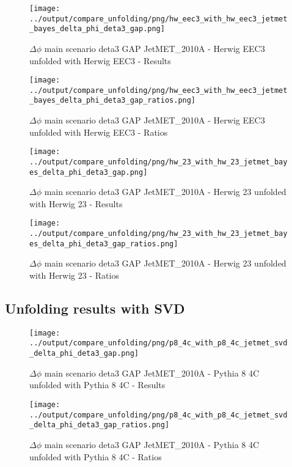 \documentclass[11pt]{book}
\begin{document}
\begin{figure}[ht]
\centering
\texttt{[image: ../output/compare\_unfolding/png/hw\_eec3\_with\_hw\_eec3\_jetmet\_bayes\_delta\_phi\_deta3\_gap.png]}
\caption{$\Delta\phi$ main scenario deta3 GAP JetMET\_2010A - Herwig EEC3 unfolded with Herwig EEC3 - Results}
\label{hw_eec3_hw_eec3_jetmet_bayes_delta_phi_deta3_gap_a}
\end{figure}

\begin{figure}[ht]
\centering
\texttt{[image: ../output/compare\_unfolding/png/hw\_eec3\_with\_hw\_eec3\_jetmet\_bayes\_delta\_phi\_deta3\_gap\_ratios.png]}
\caption{$\Delta\phi$ main scenario deta3 GAP JetMET\_2010A - Herwig EEC3 unfolded with Herwig EEC3 - Ratios}
\label{hw_eec3_hw_eec3_jetmet_bayes_delta_phi_deta3_gap_b}
\end{figure}

\begin{figure}[ht]
\centering
\texttt{[image: ../output/compare\_unfolding/png/hw\_23\_with\_hw\_23\_jetmet\_bayes\_delta\_phi\_deta3\_gap.png]}
\caption{$\Delta\phi$ main scenario deta3 GAP JetMET\_2010A - Herwig 23 unfolded with Herwig 23 - Results}
\label{hw_23_hw_23_jetmet_bayes_delta_phi_deta3_gap_a}
\end{figure}

\begin{figure}[ht]
\centering
\texttt{[image: ../output/compare\_unfolding/png/hw\_23\_with\_hw\_23\_jetmet\_bayes\_delta\_phi\_deta3\_gap\_ratios.png]}
\caption{$\Delta\phi$ main scenario deta3 GAP JetMET\_2010A - Herwig 23 unfolded with Herwig 23 - Ratios}
\label{hw_23_hw_23_jetmet_bayes_delta_phi_deta3_gap_b}
\end{figure}


\clearpage
\subsection{Unfolding results with SVD}

\begin{figure}[ht]
\centering
\texttt{[image: ../output/compare\_unfolding/png/p8\_4c\_with\_p8\_4c\_jetmet\_svd\_delta\_phi\_deta3\_gap.png]}
\caption{$\Delta\phi$ main scenario deta3 GAP JetMET\_2010A - Pythia 8 4C unfolded with Pythia 8 4C - Results}
\label{p8_p8_jetmet_svd_delta_phi_deta3_gap_a}
\end{figure}

\begin{figure}[ht]
\centering
\texttt{[image: ../output/compare\_unfolding/png/p8\_4c\_with\_p8\_4c\_jetmet\_svd\_delta\_phi\_deta3\_gap\_ratios.png]}
\caption{$\Delta\phi$ main scenario deta3 GAP JetMET\_2010A - Pythia 8 4C unfolded with Pythia 8 4C - Ratios}
\label{p8_p8_jetmet_svd_delta_phi_deta3_gap_b}
\end{figure}
\end{document}
